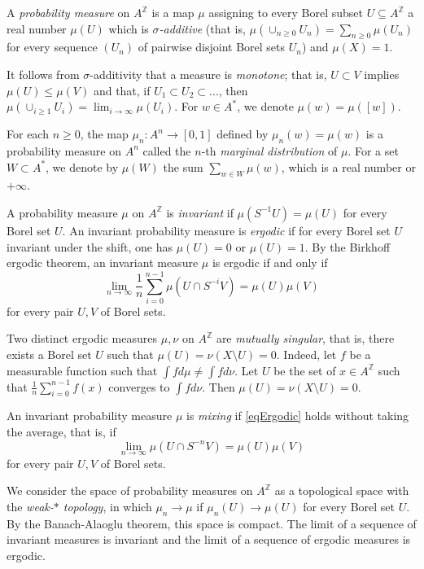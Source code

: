 \documentclass{article}[11pt]
\newcommand{\Z}{\mathbb{Z}}
\numberwithin{theorem}{section}
\numberwithin{equation}{section}
\numberwithin{figure}{section}
\numberwithin{table}{section}
\begin{document}
A \emph{probability measure} on $A^\Z$ is a map $\mu$ assigning to every Borel subset $U \subseteq A^{\Z}$ a real number $\mu(U)$ which is \emph{$\sigma$-additive}
(that is, $\mu(\cup_{n\ge 0} U_n)=\sum_{n\ge 0} \mu(U_n)$ for every sequence $(U_n)$ of pairwise disjoint
Borel sets $U_n$) and $\mu(X)=1$.

It follows from $\sigma$-additivity that a measure is \emph{monotone}; that is,
$U\subset V$ implies $\mu(U)\le\mu(V)$ and that, if
$U_1\subset U_2\subset\ldots$, then $\mu(\cup_{i\ge 1} U_i)=\lim_{i\to\infty}\mu(U_i)$.
For $w\in A^*$, we denote $\mu(w)=\mu([w])$. 

For each $n\ge 0$, the map $\mu_n\colon A^n\to[0,1]$
defined by $\mu_n(w)=\mu(w)$ is a probability measure on $A^n$ called the $n$-th \emph{marginal distribution}
of $\mu$.
For a set $W\subset A^*$,
we denote by $\mu(W)$ the sum $\sum_{w\in W}\mu(w)$, which is a real number or $+\infty$.

A probability measure $\mu$ on $A^\Z$ is \emph{invariant} if $\mu(S^{-1}U)=\mu(U)$
for every Borel set $U$.
An invariant probability measure is \emph{ergodic} if for every Borel set $U$ invariant under the shift, one has $\mu(U)=0$ or $\mu(U)=1$. By the Birkhoff ergodic theorem, an invariant measure
$\mu$ is ergodic if and only if 
\begin{equation}
\lim_{n\to\infty}\frac{1}{n}\sum_{i=0}^{n-1}\mu(U\cap S^{-i}V)=\mu(U)\mu(V)\label{eqErgodic}
\end{equation}
for every pair $U,V$ of Borel sets.

Two distinct ergodic measures $\mu,\nu$
on $A^\Z$ are \emph{mutually singular}, that is, there
exists a Borel set $U$ such that
$\mu(U)=\nu(X\setminus U)=0$. Indeed,
let $f$ be a measurable function such
that $\int fd\mu\ne\int f d\nu$. Let
$U$ be the set of $x\in A^\Z$ such that
$\frac{1}{n}\sum_{i=0}^{n-1}f(x)$
converges to $\int fd\nu$. Then
$\mu(U)=\nu(X\setminus U)=0$.

An invariant probability measure $\mu$ is \emph{mixing} if \eqref{eqErgodic} holds without taking the average, that is, if
\begin{equation}
\lim_{n\to\infty}\mu(U\cap S^{-n}V)=\mu(U)\mu(V)\label{eqMixing}
\end{equation}
for every pair $U,V$ of Borel sets.

We consider the space of probability measures on $A^\Z$ as a topological
space with the \emph{weak-$*$ topology}, in which $\mu_n\to\mu$
if $\mu_n(U)\to\mu(U)$ for every Borel set $U$. By the Banach-Alaoglu theorem,
this space is compact. The limit of a sequence of invariant measures is invariant
and the limit of a sequence of ergodic measures is ergodic.
\end{document}
